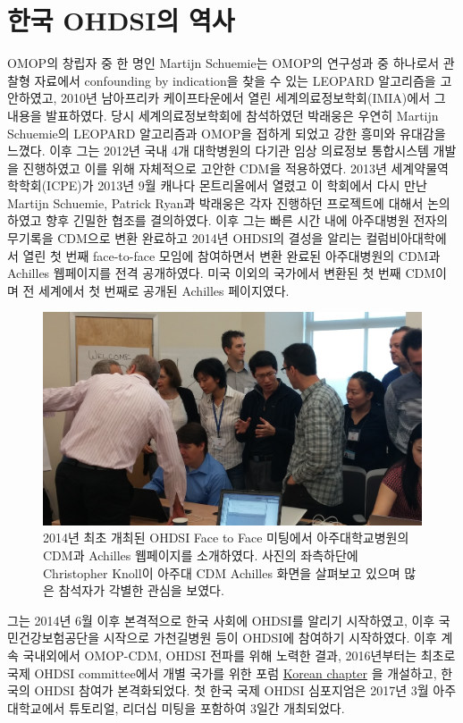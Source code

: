 \documentclass[11pt]{book}
\theoremstyle{definition}
\theoremstyle{definition}
\theoremstyle{definition}
\theoremstyle{remark}
\begin{document}
\section{한국 OHDSI의 역사}\label{-ohdsi-}

OMOP의 창립자 중 한 명인 Martijn Schuemie는 OMOP의 연구성과 중 하나로서
관찰형 자료에서 confounding by indication을 찾을 수 있는 LEOPARD
알고리즘을 고안하였고, 2010년 남아프리카 케이프타운에서 열린
세계의료정보학회(IMIA)에서 그 내용을 발표하였다. 당시 세계의료정보학회에
참석하였던 박래웅은 우연히 Martijn Schuemie의 LEOPARD 알고리즘과 OMOP을
접하게 되었고 강한 흥미와 유대감을 느꼈다. 이후 그는 2012년 국내 4개
대학병원의 다기관 임상 의료정보 통합시스템 개발을 진행하였고 이를 위해
자체적으로 고안한 CDM을 적용하였다. 2013년 세계약물역학학회(ICPE)가
2013년 9월 캐나다 몬트리올에서 열렸고 이 학회에서 다시 만난 Martijn
Schuemie, Patrick Ryan과 박래웅은 각자 진행하던 프로젝트에 대해서
논의하였고 향후 긴밀한 협조를 결의하였다. 이후 그는 빠른 시간 내에
아주대병원 전자의무기록을 CDM으로 변환 완료하고 2014년 OHDSI의 결성을
알리는 컬럼비아대학에서 열린 첫 번째 face-to-face 모임에 참여하면서 변환
완료된 아주대병원의 CDM과 Achilles 웹페이지를 전격 공개하였다. 미국
이외의 국가에서 변환된 첫 번째 CDM이며 전 세계에서 첫 번째로 공개된
Achilles 페이지였다.

\begin{figure}

{\centering \includegraphics[width=0.8\linewidth]{images/OhdsiCommunity/2014f2fmeeting_korea} 

}

\caption{2014년 최초 개최된 OHDSI Face to Face 미팅에서 아주대학교병원의 CDM과 Achilles 웹페이지를 소개하였다. 사진의 좌측하단에 Christopher Knoll이 아주대 CDM Achilles 화면을 살펴보고 있으며 많은 참석자가 각별한 관심을 보였다.}\label{fig:OHDSIf2f2014}
\end{figure}

그는 2014년 6월 이후 본격적으로 한국 사회에 OHDSI를 알리기 시작하였고,
이후 국민건강보험공단을 시작으로 가천길병원 등이 OHDSI에 참여하기
시작하였다. 이후 계속 국내외에서 OMOP-CDM, OHDSI 전파를 위해 노력한
결과, 2016년부터는 최초로 국제 OHDSI committee에서 개별 국가를 위한 포럼
\href{http://forums.ohdsi.org/c/For-collaborators-wishing-to-communicate-in-Korean}{Korean
chapter} 을 개설하고, 한국의 OHDSI 참여가 본격화되었다. 첫 한국 국제
OHDSI 심포지엄은 2017년 3월 아주대학교에서 튜토리얼, 리더십 미팅을
포함하여 3일간 개최되었다.
\end{document}
